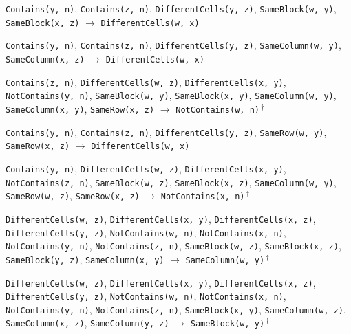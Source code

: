 \documentclass[11pt,a4paper]{article}
\theoremstyle{definition}
\theoremstyle{remark}
\begin{document}
{\begin{enumerate}[label={[\arabic*]},leftmargin=2.6em,itemsep=1pt]
  \item \texttt{Contains(y,~n)}, \allowbreak \texttt{Contains(z,~n)}, \allowbreak \texttt{DifferentCells(y,~z)}, \allowbreak \texttt{SameBlock(w,~y)}, \allowbreak \texttt{SameBlock(x,~z)} \;$\to$\; \texttt{DifferentCells(w,~x)}
  \item \texttt{Contains(y,~n)}, \allowbreak \texttt{Contains(z,~n)}, \allowbreak \texttt{DifferentCells(y,~z)}, \allowbreak \texttt{SameColumn(w,~y)}, \allowbreak \texttt{SameColumn(x,~z)} \;$\to$\; \texttt{DifferentCells(w,~x)}
  \item \texttt{Contains(z,~n)}, \allowbreak \texttt{DifferentCells(w,~z)}, \allowbreak \texttt{DifferentCells(x,~y)}, \allowbreak \texttt{NotContains(y,~n)}, \allowbreak \texttt{SameBlock(w,~y)}, \allowbreak \texttt{SameBlock(x,~y)}, \allowbreak \texttt{SameColumn(w,~y)}, \allowbreak \texttt{SameColumn(x,~y)}, \allowbreak \texttt{SameRow(x,~z)} \;$\to$\; \texttt{NotContains(w,~n)}\,$^{\dagger}$
  \item \texttt{Contains(y,~n)}, \allowbreak \texttt{Contains(z,~n)}, \allowbreak \texttt{DifferentCells(y,~z)}, \allowbreak \texttt{SameRow(w,~y)}, \allowbreak \texttt{SameRow(x,~z)} \;$\to$\; \texttt{DifferentCells(w,~x)}
  \item \texttt{Contains(y,~n)}, \allowbreak \texttt{DifferentCells(w,~z)}, \allowbreak \texttt{DifferentCells(x,~y)}, \allowbreak \texttt{NotContains(z,~n)}, \allowbreak \texttt{SameBlock(w,~z)}, \allowbreak \texttt{SameBlock(x,~z)}, \allowbreak \texttt{SameColumn(w,~y)}, \allowbreak \texttt{SameRow(w,~z)}, \allowbreak \texttt{SameRow(x,~z)} \;$\to$\; \texttt{NotContains(x,~n)}\,$^{\dagger}$
  \item \texttt{DifferentCells(w,~z)}, \allowbreak \texttt{DifferentCells(x,~y)}, \allowbreak \texttt{DifferentCells(x,~z)}, \allowbreak \texttt{DifferentCells(y,~z)}, \allowbreak \texttt{NotContains(w,~n)}, \allowbreak \texttt{NotContains(x,~n)}, \allowbreak \texttt{NotContains(y,~n)}, \allowbreak \texttt{NotContains(z,~n)}, \allowbreak \texttt{SameBlock(w,~z)}, \allowbreak \texttt{SameBlock(x,~z)}, \allowbreak \texttt{SameBlock(y,~z)}, \allowbreak \texttt{SameColumn(x,~y)} \;$\to$\; \texttt{SameColumn(w,~y)}\,$^{\dagger}$
  \item \texttt{DifferentCells(w,~z)}, \allowbreak \texttt{DifferentCells(x,~y)}, \allowbreak \texttt{DifferentCells(x,~z)}, \allowbreak \texttt{DifferentCells(y,~z)}, \allowbreak \texttt{NotContains(w,~n)}, \allowbreak \texttt{NotContains(x,~n)}, \allowbreak \texttt{NotContains(y,~n)}, \allowbreak \texttt{NotContains(z,~n)}, \allowbreak \texttt{SameBlock(x,~y)}, \allowbreak \texttt{SameColumn(w,~z)}, \allowbreak \texttt{SameColumn(x,~z)}, \allowbreak \texttt{SameColumn(y,~z)} \;$\to$\; \texttt{SameBlock(w,~y)}\,$^{\dagger}$

\end{enumerate}}
\end{document}
